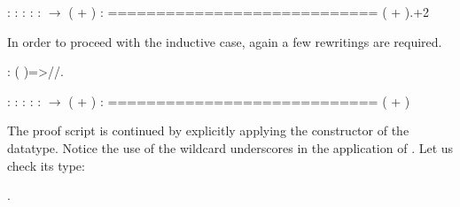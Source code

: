 \coqdoceol
\coqdocemptyline
\coqdocindent{1.00em}
 : \coqdoceol
\coqdocindent{1.00em}
 : \coqdoceol
\coqdocindent{1.00em}
 : \coqdoceol
\coqdocindent{1.00em}
 :  \coqdoceol
\coqdocindent{1.00em}
 :   \ensuremath{\rightarrow}  ( + )\coqdoceol
\coqdocindent{1.00em}
 :  \coqdoceol
\coqdocindent{1.00em}
============================\coqdoceol
\coqdocindent{1.50em}
 ( + ).+2

\coqdocemptyline


In order to proceed with the inductive case, again a few rewritings
are required.


\begin{coqdoccode}
\coqdocemptyline
\coqdocnoindent
{}: ( \coqdocvar{\_} \coqdocvar{\_})=>//.\coqdoceol
\coqdocemptyline
\end{coqdoccode}


\coqdoceol
\coqdocemptyline
\coqdocindent{1.00em}
 : \coqdoceol
\coqdocindent{1.00em}
 : \coqdoceol
\coqdocindent{1.00em}
 : \coqdoceol
\coqdocindent{1.00em}
 :  \coqdoceol
\coqdocindent{1.00em}
 :   \ensuremath{\rightarrow}  ( + )\coqdoceol
\coqdocindent{1.00em}
 :  \coqdoceol
\coqdocindent{1.00em}
============================\coqdoceol
\coqdocindent{1.50em}
 ( + )

\coqdocemptyline


The proof script is continued by explicitly applying the constructor
 of the  datatype. Notice the use of the wildcard
underscores  in the application of . Let us
check its type:


\begin{coqdoccode}
\coqdocemptyline
\coqdocnoindent
{} .\coqdoceol
\coqdocemptyline
\end{coqdoccode}


